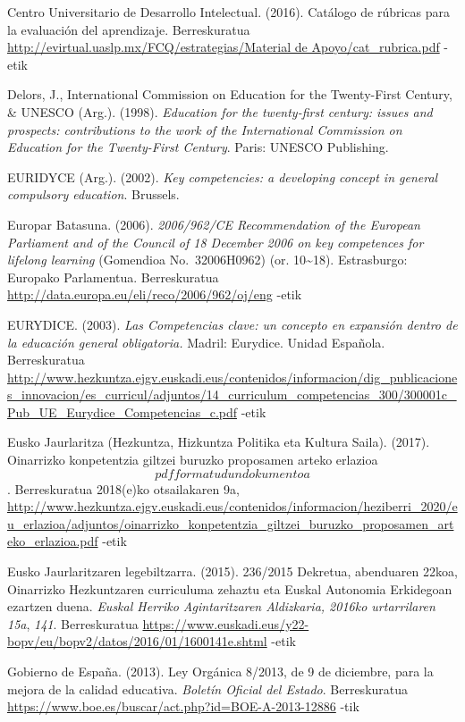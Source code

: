 \documentclass[]{book}
\begin{document}
Centro Universitario de Desarrollo Intelectual. (2016). Catálogo de rúbricas para la evaluación del aprendizaje. Berreskuratua \href{http://evirtual.uaslp.mx/FCQ/estrategias/Material\%20de\%20Apoyo/cat_rubrica.pdf}{http://evirtual.uaslp.mx/FCQ/estrategias/Material de Apoyo/cat\_rubrica.pdf} -etik

Delors, J., International Commission on Education for the Twenty-First Century, \& UNESCO (Arg.). (1998). \emph{Education for the twenty-first century: issues and prospects: contributions to the work of the International Commission on Education for the Twenty-First Century}. Paris: UNESCO Publishing.

EURIDYCE (Arg.). (2002). \emph{Key competencies: a developing concept in general compulsory education}. Brussels.

Europar Batasuna. (2006). \emph{2006/962/CE Recommendation of the European Parliament and of the Council of 18 December 2006 on key competences for lifelong learning} (Gomendioa No.~32006H0962) (or. 10\textasciitilde{}18). Estrasburgo: Europako Parlamentua. Berreskuratua \url{http://data.europa.eu/eli/reco/2006/962/oj/eng} -etik

EURYDICE. (2003). \emph{Las Competencias clave: un concepto en expansión dentro de la educación general obligatoria.} Madril: Eurydice. Unidad Española. Berreskuratua \url{http://www.hezkuntza.ejgv.euskadi.eus/contenidos/informacion/dig_publicaciones_innovacion/es_curricul/adjuntos/14_curriculum_competencias_300/300001c_Pub_UE_Eurydice_Competencias_c.pdf} -etik

Eusko Jaurlaritza (Hezkuntza, Hizkuntza Politika eta Kultura Saila). (2017). Oinarrizko konpetentzia giltzei buruzko proposamen arteko erlazioa \[pdf formatudun dokumentoa\]. Berreskuratua 2018(e)ko otsailakaren 9a, \url{http://www.hezkuntza.ejgv.euskadi.eus/contenidos/informacion/heziberri_2020/eu_erlazioa/adjuntos/oinarrizko_konpetentzia_giltzei_buruzko_proposamen_arteko_erlazioa.pdf} -etik

Eusko Jaurlaritzaren legebiltzarra. (2015). 236/2015 Dekretua, abenduaren 22koa, Oinarrizko Hezkuntzaren curriculuma zehaztu eta Euskal Autonomia Erkidegoan ezartzen duena. \emph{Euskal Herriko Agintaritzaren Aldizkaria, 2016ko urtarrilaren 15a}, \emph{141}. Berreskuratua \url{https://www.euskadi.eus/y22-bopv/eu/bopv2/datos/2016/01/1600141e.shtml} -etik

Gobierno de España. (2013). Ley Orgánica 8/2013, de 9 de diciembre, para la mejora de la calidad educativa. \emph{Boletín Oficial del Estado}. Berreskuratua \url{https://www.boe.es/buscar/act.php?id=BOE-A-2013-12886} -tik
\end{document}
